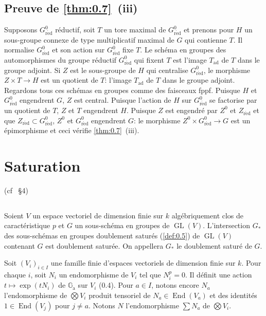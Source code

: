 \documentclass[11pt,a4paper]{article}
\theoremstyle{plain}
\theoremstyle{definition}
\DeclareMathOperator{\End}{End}
\DeclareMathOperator{\GL}{GL}
\DeclareMathOperator{\ad}{ad}
\newcommand{\Ga}{\mathbb{G}_\mathrm{a}}
\newcommand{\red}{\mathrm{r\acute{e}d}}
\begin{document}
\subsection{Preuve de \ref{thm:0.7}~(iii)}\label{sec:1.25}

Supposons $G^0_\red$ r\'eductif, soit $T$ un tore maximal de $G^0_\red$ et prenons pour $H$ un sous-groupe connexe de type multiplicatif maximal de $G$ qui contienne $T$. Il normalise $G^0_\red$ et son action sur $G^0_\red$ fixe $T$. Le sch\'ema en groupes des automorphismes du groupe r\'eductif $G^0_\red$ qui fixent $T$ est l'image $T_{\ad}$ de $T$ dans le groupe adjoint. Si $Z$ est le sous-groupe de $H$ qui centralise $G^0_\red$, le morphisme $Z \times T \to H$ est un quotient de $T$: l'image $T_{\ad}$ de $T$ dans le groupe adjoint. Regardons tous ces sch\'emas en groupes comme des faisceaux fppf. Puisque $H$ et $G^0_\red$ engendrent $G$, $Z$ est central. Puisque l'action de $H$ sur $G^0_\red$ se factorise par un quotient de $T$, $Z$ et $T$ engendrent $H$. Puisque $Z$ est engendr\'e par $Z^0$ et $Z_\red$ et que $Z_\red \subset G^0_\red$, $Z^0$ et $G^0_\red$ engendrent $G$: le morphisme $Z^0 \times G^0_\red \to G$ est un \'epimorphisme et ceci v\'erifie \ref{thm:0.7}~(iii).

\section{Saturation}\label{sec:2}

(cf \cite{Serre1994}~\S4)

\subsection{}
Soient $V$ un espace vectoriel de dimension finie sur $k$ alg\'ebriquement clos de caract\'eristique $p$ et $G$ un sous-sch\'ema en groupes de $\GL(V)$. L'intersection $G_*$ des sous-sch\'emas en groupes doublement satur\'es (\ref{def:0.5}) de $\GL(V)$ contenant $G$ est doublement satur\'ee. On appellera $G_*$ le doublement satur\'e de $G$.

Soit $(V_i)_{i \in I}$ une famille finie d'espaces vectoriels de dimension finie sur $k$. Pour chaque $i$, soit $N_i$ un endomorphisme de $V_i$ tel que $N_i^p = 0$. Il d\'efinit une action $t \mapsto \exp(tN_i)$ de $\Ga$ sur $V_i$ (0.4). Pour $a \in I$, notons encore $N_a$ l'endomorphisme de $\bigotimes V_i$ produit tensoriel de $N_a \in \End(V_a)$ et des identit\'es $1 \in \End(V_j)$ pour $j \neq a$. Notons $N$ l'endomorphisme $\sum N_a$ de $\bigotimes V_i$.
\end{document}
